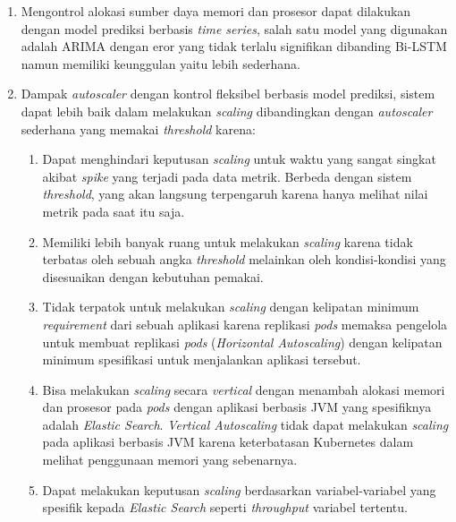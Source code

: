 \begin{enumerate}
    \item Mengontrol alokasi sumber daya memori dan prosesor dapat dilakukan dengan model prediksi berbasis \textit{time series}, salah satu model yang digunakan adalah ARIMA dengan eror yang tidak terlalu signifikan dibanding Bi-LSTM namun memiliki keunggulan yaitu lebih sederhana.
    \item Dampak \textit{autoscaler} dengan kontrol fleksibel berbasis model prediksi, sistem dapat lebih baik dalam melakukan \textit{scaling} dibandingkan dengan \textit{autoscaler} sederhana yang memakai \textit{threshold} karena:

        \begin{enumerate}
            \item Dapat menghindari keputusan \textit{scaling} untuk waktu yang sangat singkat akibat \textit{spike} yang terjadi pada data metrik. Berbeda dengan sistem \textit{threshold}, yang akan langsung terpengaruh karena hanya melihat nilai metrik pada saat itu saja.
            \item Memiliki lebih banyak ruang untuk melakukan \textit{scaling} karena tidak terbatas oleh sebuah angka \textit{threshold} melainkan oleh kondisi-kondisi yang disesuaikan dengan kebutuhan pemakai.
            \item Tidak terpatok untuk melakukan \textit{scaling} dengan kelipatan minimum \textit{requirement} dari sebuah aplikasi karena replikasi \textit{pods} memaksa pengelola untuk membuat replikasi \textit{pods} (\textit{Horizontal Autoscaling}) dengan kelipatan minimum spesifikasi untuk menjalankan aplikasi tersebut.
            \item Bisa melakukan \textit{scaling} secara \textit{vertical} dengan menambah alokasi memori dan prosesor pada \textit{pods} dengan aplikasi berbasis JVM yang spesifiknya adalah \textit{Elastic Search}. \textit{Vertical Autoscaling} tidak dapat melakukan \textit{scaling} pada aplikasi berbasis JVM karena keterbatasan Kubernetes dalam melihat penggunaan memori yang sebenarnya.
            \item Dapat melakukan keputusan \textit{scaling} berdasarkan variabel-variabel yang spesifik kepada \textit{Elastic Search} seperti \textit{throughput} variabel tertentu.
        \end{enumerate}
\end{enumerate}

